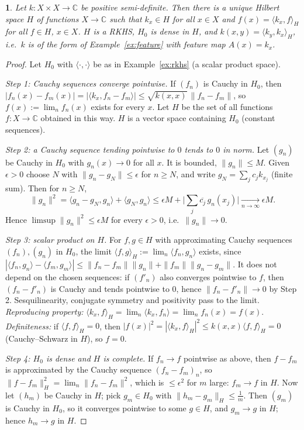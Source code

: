 \documentclass[11pt,a4paper]{article}
\numberwithin{equation}{section}
\newcommand{\C}{\mathbb{C}}
\newcommand{\ip}[2]{\langle #1, #2\rangle}
\newcommand{\conj}[1]{\overline{#1}}
\theoremstyle{plain}
\theoremstyle{definition}
\newcommand{\thistheoremname}{}
\theoremstyle{plain}
\newtheorem*{addedthm*}{\thistheoremname}
\theoremstyle{definition}
\newenvironment{addedthm}[1]{\renewcommand{\thistheoremname}{#1}\begin{addedthm*}}{\end{addedthm*}}
\begin{document}
\begin{addedthm}{Theorem 8.7 (Moore--Aronszajn)}
Let $k:X\times X\to\C$ be positive semi-definite. Then there is a unique Hilbert space $H$ of
functions $X\to\C$ such that $k_x\in H$ for all $x\in X$ and $f(x)=\ip{k_x}{f}_H$ for all
$f\in H$, $x\in X$. $H$ is a RKHS, $H_0$ is dense in $H$, and $k(x,y)=\ip{k_y}{k_x}_H$, i.e.\
$k$ is of the form of Example~\ref{ex:feature} with feature map $A(x)=k_x$.
\end{addedthm}
\begin{proof}
Let $H_0$ with $\ip\cdot\cdot$ be as in Example~\ref{ex:rkhs} (a scalar product space).

\emph{Step 1: Cauchy sequences converge pointwise.} If $(f_n)$ is Cauchy in $H_0$, then
$|f_n(x)-f_m(x)|=|\ip{k_x}{f_n-f_m}|\le\sqrt{k(x,x)}\,\|f_n-f_m\|$, so $f(x):=\lim_nf_n(x)$
exists for every $x$. Let $H$ be the set of all functions $f:X\to\C$ obtained in this way.
$H$ is a vector space containing $H_0$ (constant sequences).

\emph{Step 2: a Cauchy sequence tending pointwise to $0$ tends to $0$ in norm.} Let $(g_n)$
be Cauchy in $H_0$ with $g_n(x)\to0$ for all $x$. It is bounded, $\|g_n\|\le M$. Given
$\epsilon>0$ choose $N$ with $\|g_n-g_N\|\le\epsilon$ for $n\ge N$, and write
$g_N=\sum_jc_jk_{x_j}$ (finite sum). Then for $n\ge N$,
\[
\|g_n\|^2=\ip{g_n-g_N}{g_n}+\ip{g_N}{g_n}\le\epsilon M+\Big|\sum_j\conj{c_j}\,g_n(x_j)\Big|
\xrightarrow[n\to\infty]{}\epsilon M .
\]
Hence $\limsup\|g_n\|^2\le\epsilon M$ for every $\epsilon>0$, i.e.\ $\|g_n\|\to0$.

\emph{Step 3: scalar product on $H$.} For $f,g\in H$ with approximating Cauchy sequences
$(f_n),(g_n)$ in $H_0$, the limit $\ip fg_H:=\lim_n\ip{f_n}{g_n}$ exists, since
$|\ip{f_n}{g_n}-\ip{f_m}{g_m}|\le\|f_n-f_m\|\|g_n\|+\|f_m\|\|g_n-g_m\|$. It does not depend on
the chosen sequences: if $(f'_n)$ also converges pointwise to $f$, then $(f_n-f'_n)$ is Cauchy
and tends pointwise to $0$, hence $\|f_n-f'_n\|\to0$ by Step 2. Sesquilinearity, conjugate
symmetry and positivity pass to the limit. \emph{Reproducing property:}
$\ip{k_x}f_H=\lim_n\ip{k_x}{f_n}=\lim_nf_n(x)=f(x)$. \emph{Definiteness:} if $\ip ff_H=0$, then
$|f(x)|^2=|\ip{k_x}f_H|^2\le k(x,x)\ip ff_H=0$ (Cauchy--Schwarz in $H$), so $f=0$.

\emph{Step 4: $H_0$ is dense and $H$ is complete.} If $f_n\to f$ pointwise as above, then
$f-f_m$ is approximated by the Cauchy sequence $(f_n-f_m)_n$, so
$\|f-f_m\|_H^2=\lim_n\|f_n-f_m\|^2$, which is $\le\epsilon^2$ for $m$ large: $f_m\to f$ in
$H$. Now let $(h_m)$ be Cauchy in $H$; pick $g_m\in H_0$ with $\|h_m-g_m\|_H\le\frac1m$.
Then $(g_m)$ is Cauchy in $H_0$, so it converges pointwise to some $g\in H$, and
$g_m\to g$ in $H$; hence $h_m\to g$ in $H$.


\end{proof}
\end{document}
